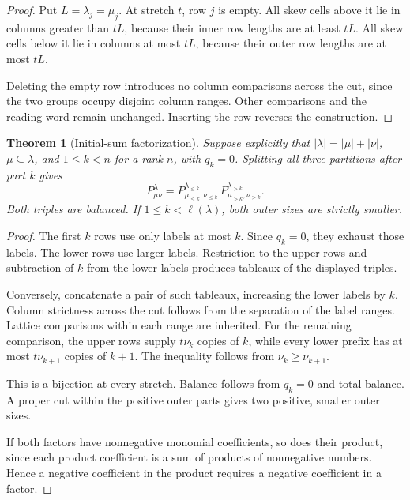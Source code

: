 \documentclass[11pt]{article}
\newtheorem{theorem}{Theorem}
\begin{document}
\begin{proof}
Put \(L=\lambda_j=\mu_j\). At stretch \(t\), row \(j\) is empty. All skew cells above it lie in columns greater than \(tL\), because their inner row lengths are at least \(tL\). All skew cells below it lie in columns at most \(tL\), because their outer row lengths are at most \(tL\).

Deleting the empty row introduces no column comparisons across the cut, since the two groups occupy disjoint column ranges. Other comparisons and the reading word remain unchanged. Inserting the row reverses the construction.
\end{proof}

\begin{theorem}[Initial-sum factorization]\label{thm:factor}
Suppose explicitly that $|\lambda|=|\mu|+|\nu|$,
$\mu\subseteq\lambda$, and $1\le k<n$ for a rank $n$, with $q_k=0$.
Splitting all three partitions after part $k$ gives
\[
P^\lambda_{\mu\nu}
=
P^{\lambda_{\le k}}_{\mu_{\le k},\nu_{\le k}}\,
P^{\lambda_{>k}}_{\mu_{>k},\nu_{>k}}.
                                                               \tag{9}
\]
Both triples are balanced. If \(1\le k<\ell(\lambda)\), both outer sizes are strictly smaller.
\end{theorem}

\begin{proof}
The first \(k\) rows use only labels at most \(k\). Since \(q_k=0\), they exhaust those labels. The lower rows use larger labels. Restriction to the upper rows and subtraction of \(k\) from the lower labels produces tableaux of the displayed triples.

Conversely, concatenate a pair of such tableaux, increasing the lower labels by \(k\). Column strictness across the cut follows from the separation of the label ranges. Lattice comparisons within each range are inherited. For the remaining comparison, the upper rows supply \(t\nu_k\) copies of \(k\), while every lower prefix has at most \(t\nu_{k+1}\) copies of \(k+1\). The inequality follows from \(\nu_k\ge\nu_{k+1}\).

This is a bijection at every stretch. Balance follows from \(q_k=0\) and total balance. A proper cut within the positive outer parts gives two positive, smaller outer sizes.

If both factors have nonnegative monomial coefficients, so does their product, since each product coefficient is a sum of products of nonnegative numbers. Hence a negative coefficient in the product requires a negative coefficient in a factor.
\end{proof}
\end{document}
